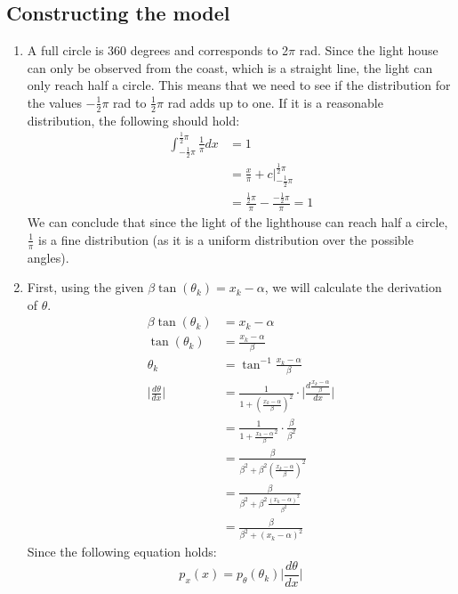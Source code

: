 \documentclass[a4paper,10pt]{article}
\numberwithin{equation}{section} %
\numberwithin{figure}{section} %
\numberwithin{table}{section} %
\theoremstyle{mytheor}
\begin{document}
\subsection{Constructing the model}
\begin{enumerate}
	\item A full circle is 360 degrees and corresponds to 2$\pi$ rad. Since the light house can only be observed from the coast, which is a straight line, the light can only reach half a circle. This means that we need to see if the distribution for the values $-\frac{1}{2}\pi$ rad to $\frac{1}{2}\pi$ rad adds up to one. If it is a reasonable distribution, the following should hold:
		\begin{align}
		\int_{-\frac{1}{2}\pi}^{\frac{1}{2}\pi} \frac{1}{\pi} dx &= 1\\
		&= \frac{x}{\pi} + c \bigg \vert_{-\frac{1}{2}\pi}^{\frac{1}{2}\pi}\\
		& = \frac{\frac{1}{2}\pi}{\pi} - \frac{-\frac{1}{2}\pi}{\pi} = 1
		\end{align}
		We can conclude that since the light of the lighthouse can reach half a circle, $\frac{1}{\pi}$ is a fine distribution (as it is a uniform distribution over the possible angles).
	\item First, using the given $\beta \tan (\theta_k) = x_k - \alpha$, we will calculate the derivation of $\theta$.
		\begin{align}
		\beta \tan (\theta_k) &= x_k - \alpha \tag{Assignment eq. 7}\\
		\tan (\theta_k) &= \frac{x_k - \alpha}{\beta} \\
		\theta_k &= \tan^{-1} \frac{x_k - \alpha}{\beta} \\
		\bigg \vert \frac{d\theta}{dx} \bigg \vert &= \frac{1}{1 + (\frac{x_k - \alpha}{\beta})^2} \cdot \bigg \vert \frac{d\frac{x_k - \alpha}{\beta}}{dx} \bigg \vert\\
		&= \frac{1}{1 + \frac{x_k - \alpha}{\beta}^2} \cdot \frac{\beta}{\beta^2}\\
		&= \frac{\beta}{\beta^2 + \beta^2(\frac{x_k - \alpha}{\beta})^2}\\
		&= \frac{\beta}{\beta^2 + \beta^2\frac{(x_k - \alpha)^2}{\beta^2}}\\
		& = \frac{\beta}{\beta^2 + (x_k - \alpha)^2}
		\end{align}
		Since the following equation holds:
		\begin{equation}
		p_x(x) = p_{\theta}(\theta_k)\bigg \vert \frac{d\theta}{dx} \bigg \vert \tag{Bishop 1.27}
		\end{equation}

\end{enumerate}
\end{document}
